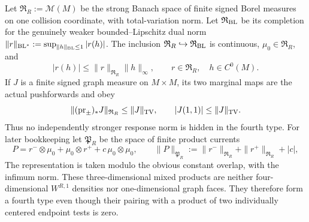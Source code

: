 \documentclass[11pt]{article}
\begin{document}
Let $\mathfrak R_R:=\mathcal M(M)$ be the strong Banach space of finite
signed Borel measures on one collision coordinate, with total-variation
norm.  Let $\mathfrak R_{\rm BL}$ be its completion for the genuinely weaker
bounded--Lipschitz dual norm
$\|r\|_{\rm BL^*}:=\sup_{\|h\|_{\rm BL}\le1}|r(h)|$.
The inclusion $\mathfrak R_R\hookrightarrow\mathfrak R_{\rm BL}$ is
continuous, $\mu_0\in\mathfrak R_R$, and
\begin{equation}
\label{eq:one-coordinate-response-pairing}
 |r(h)|\le\|r\|_{\mathfrak R_R}\|h\|_\infty,
 \qquad r\in\mathfrak R_R,\quad h\in C^0(M).
\end{equation}
If $J$ is a finite signed graph measure on $M\times M$, its two marginal
maps are the actual pushforwards and obey
\begin{equation}
\label{eq:bounded-face-marginal-maps}
 \|({\rm pr}_\pm)_*J\|_{\mathfrak R_R}
 \le\|J\|_{\rm TV},\qquad |J(1,1)|\le\|J\|_{\rm TV}.
\end{equation}
Thus no independently stronger response norm is hidden in the fourth type.
For later bookkeeping let $\mathfrak P_R$ be the space of finite product
currents
\begin{equation}
\label{eq:product-current-type}
 P=r^-\otimes\mu_0+\mu_0\otimes r^++c\,\mu_0\otimes\mu_0,\qquad
 \|P\|_{\mathfrak P_R}:=\|r^-\|_{\mathfrak R_R}
 +\|r^+\|_{\mathfrak R_R}+|c|,
\end{equation}
The representation is taken modulo the obvious
constant overlap, with the infimum norm.  These three-dimensional mixed
products are neither four-dimensional $W^{R,1}$ densities nor
one-dimensional graph faces.  They therefore form a fourth type even though
their pairing with a product of two individually centered endpoint tests is
zero.
\end{document}
